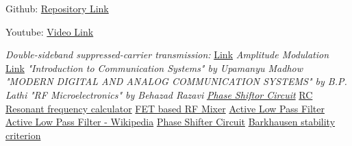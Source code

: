 \documentclass[conference]{IEEEtran}
\begin{document}
Github: \href{https://github.com/MadhanSaiKrishna/AM-Modulator-Demodulator}{Repository Link}

Youtube: \href{https://youtu.be/ZRsL6npqL7Y}{Video Link}




\begin{thebibliography}{00}
\textit{Double-sideband suppressed-carrier transmission: }
\href{https://en.wikipedia.org/wiki/Double-sideband_suppressed-carrier_transmission}{Link}
\textit{Amplitude Modulation}
\href{https://en.wikipedia.org/wiki/Amplitude_modulation}{Link}
\textit{"Introduction to Communication Systems" by Upamanyu Madhow}
\textit{"MODERN DIGITAL AND ANALOG COMMUNICATION SYSTEMS" by B.P. Lathi}
\textit{"RF Microelectronics" by Behazad Razavi}
\href{https://vesit.ves.ac.in/RC_phase_shift/theory}{\textit{Phase Shiftor Circuit}}
\href{https://www.omnicalculator.com/physics/rc-circuit}{RC Resonant frequency calculator}
\href{https://www.electronics-notes.com/articles/radio/rf-mixer/fet-rf-mixer.php}{FET based RF Mixer}
\href{https://www.electronics-tutorials.ws/filter/filter_5.html}{Active Low Pass Filter}
\href{https://en.wikipedia.org/wiki/Low-pass_filter}{Active Low Pass Filter - Wikipedia}
\href{https://wiraelectrical.com/phase-shifter-formula-and-operation/}{Phase Shifter Circuit}
\href{https://en.wikipedia.org/wiki/Barkhausen_stability_criterion}{Barkhausen stability criterion}
\end{thebibliography}
\end{document}
